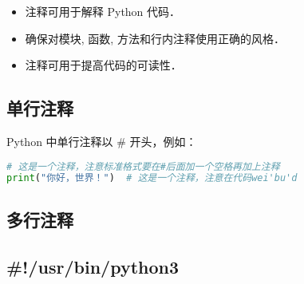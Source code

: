 
\begin{itemize}
\item 注释可用于解释 Python 代码．
\item 确保对模块, 函数, 方法和行内注释使用正确的风格．
\item 注释可用于提高代码的可读性．
\end{itemize}

\subsection{单行注释}
Python 中单行注释以 # 开头，例如：
\begin{lstlisting}[language=python]
# 这是一个注释，注意标准格式要在#后面加一个空格再加上注释
print("你好，世界！")  # 这是一个注释，注意在代码wei'bu'd
\end{lstlisting}

\subsection{多行注释}

\subsection{#!/usr/bin/python3 }

